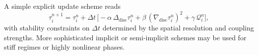 A simple explicit update scheme reads
\[
\tau^{n+1}_i = \tau^n_i + \Delta t\,
\Big[-\alpha\,\Delta_{\mathrm{disc}}\tau^n_i
      + \beta\,(\nabla_{\mathrm{disc}}\tau^n_i)^2
      + \gamma\,\mathcal{Q}^n_i\Big],
\]
with stability constraints on \(\Delta t\) determined by the spatial resolution and coupling strengths.
More sophisticated implicit or semi-implicit schemes may be used for stiff regimes or highly nonlinear phases.

